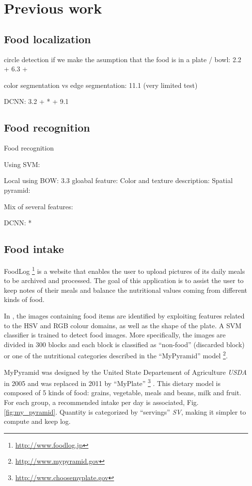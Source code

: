 \chapter{Previous work} \label{sec:previous_work}

\section{Food localization}

circle detection if we make the asumption that the food is in a plate / bowl: 2.2 + 6.3 + \cite{Dehais2015}

color segmentation vs edge segmentation: 11.1 (very limited test)

DCNN: 3.2 + * + 9.1

\section{Food recognition}

Food recognition

Using SVM:

Local using BOW: 3.3
gloabal feature:
Color and texture description: 
Spatial pyramid:

Mix of several features:

DCNN: *

\section{Food intake}

FoodLog \footnote{\url{http://www.foodlog.jp}} is a website that enables the user to upload pictures of its daily meals to be archived and processed. The goal of this application is to assist the user to keep notes of their meals and balance the nutritional values coming from different kinds of food.

In \cite{Kitamura2008}, the images containing food items are identified by exploiting features related to the HSV and RGB colour domains, as well as the shape of the plate. A SVM classifier is trained to detect food images. More specifically, the images are divided in 300 blocks and each block is classified as \enquote{non-food} (discarded block) or one of the nutritional categories described in the \enquote{MyPyramid} model \footnote{\url{http://www.mypyramid.gov}}.

MyPyramid \cite{MyPyramid} was designed by the United State Departement of Agriculture \textit{USDA} in 2005 and was replaced in 2011 by \enquote{MyPlate} \footnote{\url{http://www.choosemyplate.gov}} \cite{MyPlate}. This dietary model is composed of 5 kinds of food: grains, vegetable, meals and beans, milk and fruit. For each group, a recommended intake per day is associated, Fig. \ref{fig:my_pyramid}. Quantity is categorized by \enquote{servings} \textit{SV}, making it simpler to compute and keep log.

